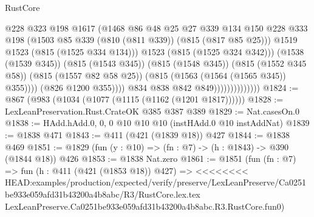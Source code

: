 \begin{lexlean}{RustCore}
\begin{coremodule}
{\begin{coremodule}
{{{{{{                                            @228
                                            @323
                                            @198
                                            @1617
                                            (@1468
                                              @86
                                              @48
                                              @25
                                              @27
                                              @339
                                              @134
                                              @150
                                              @228
                                              @333
                                              @198
                                              (@1503
                                                @85
                                                @339
                                                (@810 (@811 @339))
                                                (@815 (@817 @85 @25)))
                                              @1519
                                              @1523
                                              (@815 (@1525 @334 @134)))
                                            @1523
                                            (@815 (@1525 @324 @342)))
                                          (@1538 (@1539 @345))
                                          (@815 (@1543 @345))
                                          (@815 (@1548 @345))
                                          (@815 (@1552 @345 @58))
                                          (@815 (@1557 @82 @58 @25))
                                          (@815 (@1563 (@1564 (@1565 @345)) @355))))
                                      (@826 @1200 @355))))
                                @834
                                @838
                                @842
                                @849))))))))))))))
@1824 := @867 (@983 (@1034 (@1077 (@1115 (@1162 (@1201 @1817))))))
@1828 := LexLeanPreservation.Rust.CrateOK @385 @387 @389
@1829 := Nat.casesOn.{0}
@1838 := HAdd.hAdd.{0, 0, 0} @10 @10 @10 (instHAdd.{0} @10 instAddNat)
@1839 := @1838 @471
@1843 := @411 (@421 (@1839 @18)) @427
@1844 := @1838 @469
@1851 := @1829 (fun (y : @10) => (fn : @7) -> (h : @1843) -> @390 (@1844 @18)) @426
@1853 := @1838 Nat.zero
@1861 := @1851
    (fun (fn : @7) =>
    fun (h : @411 (@421 (@1853 @18)) @427) =>
<<<<<<<< HEAD:examples/production/expected/verify/preserve/LexLeanPreserve/Ca0251be933e059afd31b43200a4b8abc/R3/RustCore.lex.tex
    LexLeanPreserve.Ca0251be933e059afd31b43200a4b8abc.R3.RustCore.fun0)
}}}}}}
\end{coremodule}}
\end{coremodule}
\end{lexlean}
